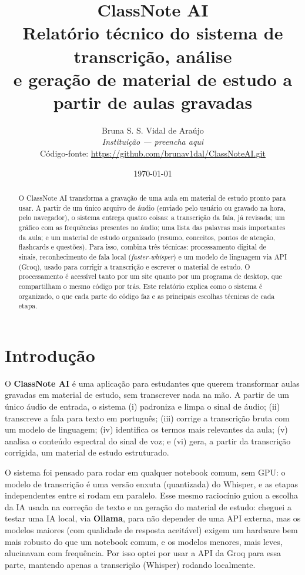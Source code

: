 \documentclass[11pt,a4paper]{article}
\title{\textbf{ClassNote AI}\\[4pt]
\large Relatório técnico do sistema de transcrição, análise\\e geração de material de estudo a partir de aulas gravadas}
\author{Bruna S. S. Vidal de Araújo\\\textit{Instituição --- preencha aqui}\\[4pt]\footnotesize Código-fonte: \url{https://github.com/brunav1dal/ClassNoteAI.git}}
\date{\today}
\begin{document}
\maketitle
\thispagestyle{empty}

\begin{abstract}
\noindent
O ClassNote AI transforma a gravação de uma aula em material de estudo pronto para usar. A partir de um único arquivo de áudio (enviado pelo usuário ou gravado na hora, pelo navegador), o sistema entrega quatro coisas: a transcrição da fala, já revisada; um gráfico com as frequências presentes no áudio; uma lista das palavras mais importantes da aula; e um material de estudo organizado (resumo, conceitos, pontos de atenção, flashcards e questões). Para isso, combina três técnicas: processamento digital de sinais, reconhecimento de fala local (\emph{faster-whisper}) e um modelo de linguagem via API (Groq), usado para corrigir a transcrição e escrever o material de estudo. O processamento é acessível tanto por um site quanto por um programa de desktop, que compartilham o mesmo código por trás. Este relatório explica como o sistema é organizado, o que cada parte do código faz e as principais escolhas técnicas de cada etapa.
\end{abstract}

\section{Introdução}

O \textbf{ClassNote AI} é uma aplicação para estudantes que querem transformar aulas gravadas em material de estudo, sem transcrever nada na mão. A partir de um único áudio de entrada, o sistema (i) padroniza e limpa o sinal de áudio; (ii) transcreve a fala para texto em português; (iii) corrige a transcrição bruta com um modelo de linguagem; (iv) identifica os termos mais relevantes da aula; (v) analisa o conteúdo espectral do sinal de voz; e (vi) gera, a partir da transcrição corrigida, um material de estudo estruturado.

O sistema foi pensado para rodar em qualquer notebook comum, sem GPU: o modelo de transcrição é uma versão enxuta (quantizada) do Whisper, e as etapas independentes entre si rodam em paralelo. Esse mesmo raciocínio guiou a escolha da IA usada na correção de texto e na geração do material de estudo: cheguei a testar uma IA local, via \textbf{Ollama}, para não depender de uma API externa, mas os modelos maiores (com qualidade de resposta aceitável) exigem um hardware bem mais robusto do que um notebook comum, e os modelos menores, mais leves, alucinavam com frequência. Por isso optei por usar a API da Groq para essa parte, mantendo apenas a transcrição (Whisper) rodando localmente.
\end{document}
